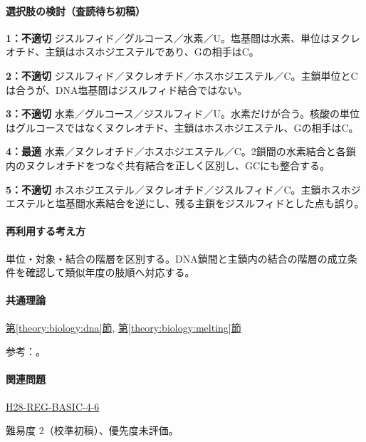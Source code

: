 \paragraph{選択肢の検討（査読待ち初稿）}\mbox{}\par

\noindent\textbf{1：不適切} ジスルフィド／グルコース／水素／U。塩基間は水素、単位はヌクレオチド、主鎖はホスホジエステルであり、Gの相手はC。\par

\noindent\textbf{2：不適切} ジスルフィド／ヌクレオチド／ホスホジエステル／C。主鎖単位とCは合うが、DNA塩基間はジスルフィド結合ではない。\par

\noindent\textbf{3：不適切} 水素／グルコース／ジスルフィド／U。水素だけが合う。核酸の単位はグルコースではなくヌクレオチド、主鎖はホスホジエステル、Gの相手はC。\par

\noindent\textbf{4：最適} 水素／ヌクレオチド／ホスホジエステル／C。2鎖間の水素結合と各鎖内のヌクレオチドをつなぐ共有結合を正しく区別し、GCにも整合する。\par

\noindent\textbf{5：不適切} ホスホジエステル／ヌクレオチド／ジスルフィド／C。主鎖ホスホジエステルと塩基間水素結合を逆にし、残る主鎖をジスルフィドとした点も誤り。\par

\paragraph{再利用する考え方} 単位・対象・結合の階層を区別する。DNA鎖間と主鎖内の結合の階層の成立条件を確認して類似年度の肢順へ対応する。

\paragraph{共通理論} \hyperref[theory:biology:dna]{第\ref*{theory:biology:dna}節}, \hyperref[theory:biology:melting]{第\ref*{theory:biology:melting}節}

\par 参考：\cite{bu_dna_melting,nhgri_dna}。

\paragraph{関連問題} \hyperref[q:h28-reg-basic-4-6]{H28-REG-BASIC-4-6}

\par 難易度 2（校準初稿）、優先度未評価。

